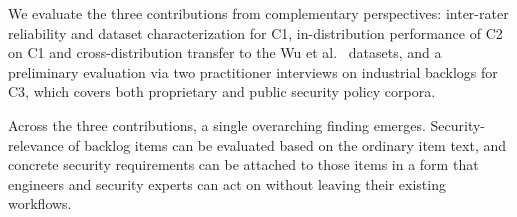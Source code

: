 We evaluate the three contributions from complementary perspectives: inter-rater reliability and dataset characterization for C1, in-distribution performance of C2 on C1 and cross-distribution transfer to the Wu et al.~\cite{wu2022data-quality} datasets, and a preliminary evaluation via two practitioner interviews on industrial backlogs for C3, which covers both proprietary and public security policy corpora.

Across the three contributions, a single overarching finding emerges. Security-relevance of backlog items can be evaluated based on the ordinary item text, and concrete security requirements can be attached to those items in a form that engineers and security experts can act on without leaving their existing workflows.
